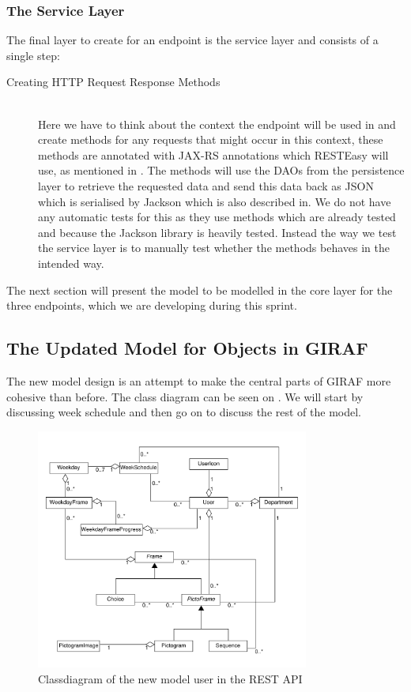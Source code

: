 \subsubsection{The Service Layer}
The final layer to create for an endpoint is the service layer and consists of a single step:
\begin{description}
	\item[Creating HTTP Request Response Methods]\hfill \\
	Here we have to think about the context the endpoint will be used in and create methods for any requests that might occur in this context, these methods are annotated with JAX-RS annotations which RESTEasy will use, as mentioned in .
	The methods will use the DAOs from the persistence layer to retrieve the requested data and send this data back as JSON which is serialised by Jackson which is also described in.
	We do not have any automatic tests for this as they use methods which are already tested and because the Jackson library is heavily tested.
	Instead the way we test the service layer is to manually test whether the methods behaves in the intended way.
\end{description}
\noindent
The next section will present the model to be modelled in the core layer for the three endpoints, which we are developing during this sprint.

\subsection{The Updated Model for Objects in GIRAF}\label{subsec:model}
The new model design is an attempt to make the central parts of GIRAF more cohesive than before.
The class diagram can be seen on .
We will start by discussing week schedule and then go on to discuss the rest of the model.

\begin{figure}[h]
    \centering
    \includegraphics[width=0.8\textwidth]{figures/fullclassdiagram.pdf}
    \caption{Classdiagram of the new model user in the REST API}\label{fig:fullmodelclassdiagram}
\end{figure}


